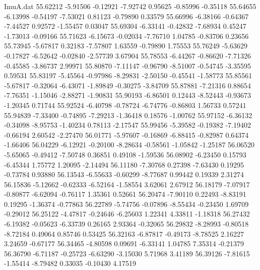 \begin{filecontents}{ImuA.dat}
  55.62212   -5.91506   -0.12921   -7.92742    0.95625   -0.85996   -0.35118
  55.64655   -6.13998   -0.54197   -7.53021    0.81123   -0.79890    0.33579
  55.66996   -6.38166   -0.64367   -7.44527    0.92572   -1.55457    0.03047
  55.69304   -6.33141   -0.42832   -7.68934    0.45247   -1.73013   -0.09166
  55.71623   -6.15673   -0.02034   -7.76710    1.04785   -0.83706    0.23656
  55.73945   -5.67817    0.32183   -7.57807    1.63559   -0.79890    1.75553
  55.76249   -5.63629   -0.17827   -6.52642   -0.02840   -2.57739    3.67904
  55.78553   -6.44267   -0.86620   -7.71326   -0.45585   -3.86737    2.99971
  55.80870   -7.11147   -0.96790   -8.51007   -0.54745   -3.35595    0.59531
  55.83197   -5.45564   -0.97986   -8.29831   -2.50150   -0.45541   -1.58773
  55.85561   -5.67817   -0.32064   -6.43071   -1.89849   -0.30275   -3.84709
  55.87881   -7.21316    0.88654   -7.76351   -1.15046   -2.88271   -1.90831
  55.90193   -6.86501    0.12443   -8.52443   -0.93673   -1.20345    0.71744
  55.92524   -6.40798   -0.78724   -6.74776   -0.86803    1.56733    0.57241
  55.94839   -7.33400   -0.74895   -7.29213   -1.36418    0.18576   -1.00762
  55.97152   -6.36132   -0.34098   -8.95753   -1.40234    0.78113   -2.17547
  55.99456   -5.39582   -0.19382   -7.19402   -0.66194    2.60542   -2.27470
  56.01771   -5.97607   -0.16869   -6.88415   -0.82987    0.64374   -1.66406
  56.04229   -6.12921   -0.20100   -8.28634   -0.58561   -1.05842   -1.25187
  56.06520   -5.65065   -0.49412   -7.50748    0.36851    0.49108   -1.59536
  56.08902   -6.23450    0.15793   -6.45344    1.75772    1.20095   -2.14494
  56.11180   -7.30768    0.27398   -7.63430    0.19295   -0.73784    0.93880
  56.13543   -6.55633   -0.60299   -8.77687    0.99442    0.19339    2.31274
  56.15836   -5.12662   -0.62333   -6.52164   -1.58554    3.62061    2.67912
  56.18179   -7.07917   -0.80877   -6.62094   -0.76117    1.35361    0.52661
  56.20474   -7.90110    0.22493   -8.83191    0.19295   -1.36374   -0.77863
  56.22789   -5.74756   -0.07896   -8.55434   -0.23450    1.69709   -0.29012
  56.25122   -4.47817   -0.24646   -6.25603    1.22341    4.33811   -1.18318
  56.27432   -6.19382   -0.05623   -6.33739    0.26165    2.93364   -0.32065
  56.29832   -8.28993   -0.80518   -8.72184    0.49064    0.85746    0.53425
  56.32163   -6.87817   -0.49173   -8.78525    2.16227    3.24659   -0.67177
  56.34465   -4.80598    0.09691   -6.33141    1.04785    7.35314   -0.21379
  56.36790   -6.71187   -0.25723   -6.63290   -3.15030    5.71968    3.41189
  56.39126   -7.81615   -1.55414   -8.79482    0.33035   -0.10430    4.17519

\end{filecontents}
